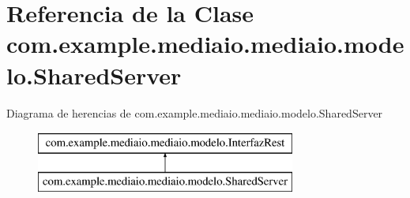 \hypertarget{classcom_1_1example_1_1mediaio_1_1mediaio_1_1modelo_1_1_shared_server}{}\section{Referencia de la Clase com.\+example.\+mediaio.\+mediaio.\+modelo.\+Shared\+Server}
\label{classcom_1_1example_1_1mediaio_1_1mediaio_1_1modelo_1_1_shared_server}
Diagrama de herencias de com.\+example.\+mediaio.\+mediaio.\+modelo.\+Shared\+Server\begin{figure}[H]
\begin{center}
\leavevmode
\includegraphics[height=2.000000cm]{classcom_1_1example_1_1mediaio_1_1mediaio_1_1modelo_1_1_shared_server}
\end{center}
\end{figure}
